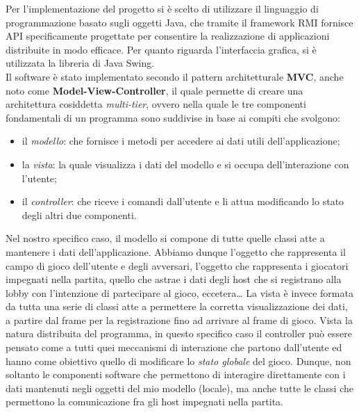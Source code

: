 Per l'implementazione del progetto si è scelto di utilizzare il linguaggio 
di programmazione basato sugli oggetti Java, che tramite il framework RMI 
fornisce API specificamente progettate per consentire la realizzazione di 
applicazioni distribuite in modo efficace. Per quanto riguarda l'interfaccia 
grafica, si è utilizzata la libreria di Java Swing.
\\
Il software è stato implementato secondo il pattern architetturale \textbf{MVC},
anche noto come \textbf{Model-View-Controller}, il quale permette di creare una
architettura cosiddetta \textit{multi-tier}, ovvero nella quale le tre
componenti fondamentali di un programma sono suddivise in base ai compiti che
svolgono:
\begin{itemize}
	\item il \textit{modello}: che fornisce i metodi per accedere ai dati utili
	dell'applicazione;
	\item la \textit{vista}: la quale visualizza i dati del modello e si 
occupa
	dell'interazione con l'utente;
	\item il \textit{controller}: che riceve i comandi dall'utente e li attua
	modificando lo stato degli altri due componenti.
\end{itemize}
Nel nostro specifico caso, il modello si compone di tutte quelle classi atte a
mantenere i dati dell'applicazione. Abbiamo dunque l'oggetto che rappresenta il
campo di gioco dell'utente e degli avversari, l'oggetto che rappresenta i
giocatori impegnati nella partita, quello che astrae i dati degli host che si
registrano alla lobby con l'intenzione di partecipare al gioco,
eccetera\dots\newline
La vista è invece formata da tutta una serie di classi atte a permettere la
corretta visualizzazione dei dati, a partire dal frame per la registrazione fino
ad arrivare al frame di gioco.\newline
Vista la natura distribuita del programma, in questo specifico caso il
controller può essere pensato come a tutti quei meccanismi di interazione che
partono dall'utente ed hanno come obiettivo quello di modificare lo
\textit{stato globale} del gioco. Dunque, non soltanto le componenti software
che permettono di interagire direttamente con i dati mantenuti negli oggetti
del mio modello (locale), ma anche tutte le classi che permettono la
comunicazione fra gli host impegnati nella partita.\newline